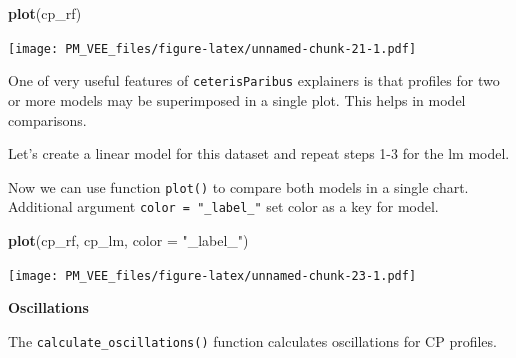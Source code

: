 \documentclass[]{book}
\newenvironment{Shaded}{\begin{snugshade}}{\end{snugshade}}
\newcommand{\DataTypeTok}[1]{\textcolor[rgb]{0.13,0.29,0.53}{#1}}
\newcommand{\KeywordTok}[1]{\textcolor[rgb]{0.13,0.29,0.53}{\textbf{#1}}}
\newcommand{\NormalTok}[1]{#1}
\newcommand{\OperatorTok}[1]{\textcolor[rgb]{0.81,0.36,0.00}{\textbf{#1}}}
\newcommand{\StringTok}[1]{\textcolor[rgb]{0.31,0.60,0.02}{#1}}
\theoremstyle{definition}
\theoremstyle{definition}
\theoremstyle{definition}
\theoremstyle{remark}
\begin{document}
\begin{Shaded}
\begin{Highlighting}[]
\KeywordTok{plot}\NormalTok{(cp_rf) }
\end{Highlighting}
\end{Shaded}

\texttt{[image: PM\_VEE\_files/figure-latex/unnamed-chunk-21-1.pdf]}

One of very useful features of \texttt{ceterisParibus} explainers is
that profiles for two or more models may be superimposed in a single
plot. This helps in model comparisons.

Let's create a linear model for this dataset and repeat steps 1-3 for
the lm model.

\begin{Shaded}
\end{Shaded}

Now we can use function \texttt{plot()} to compare both models in a
single chart. Additional argument \texttt{color\ =\ "\_label\_"} set
color as a key for model.

\begin{Shaded}
\begin{Highlighting}[]
\KeywordTok{plot}\NormalTok{(cp_rf, cp_lm, }\DataTypeTok{color =} \StringTok{"_label_"}\NormalTok{)}
\end{Highlighting}
\end{Shaded}

\texttt{[image: PM\_VEE\_files/figure-latex/unnamed-chunk-23-1.pdf]}

\textbf{Oscillations}

The \texttt{calculate\_oscillations()} function calculates oscillations
for CP profiles.
\end{document}
